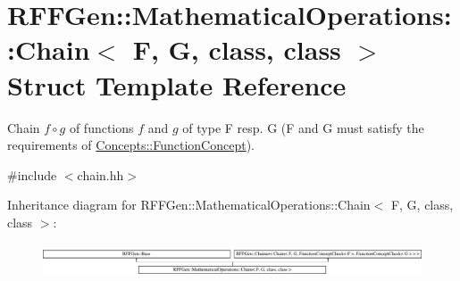 \hypertarget{structRFFGen_1_1MathematicalOperations_1_1Chain}{\section{R\-F\-F\-Gen\-:\-:Mathematical\-Operations\-:\-:Chain$<$ F, G, class, class $>$ Struct Template Reference}
\label{structRFFGen_1_1MathematicalOperations_1_1Chain}
}


Chain $ f\circ g $ of functions $f$ and $g$ of type F resp. G (F and G must satisfy the requirements of \hyperlink{structRFFGen_1_1Concepts_1_1FunctionConcept}{Concepts\-::\-Function\-Concept}).  




{\ttfamily \#include $<$chain.\-hh$>$}

Inheritance diagram for R\-F\-F\-Gen\-:\-:Mathematical\-Operations\-:\-:Chain$<$ F, G, class, class $>$\-:\begin{figure}[H]
\begin{center}
\leavevmode
\includegraphics[height=0.979021cm]{structRFFGen_1_1MathematicalOperations_1_1Chain}
\end{center}
\end{figure}
